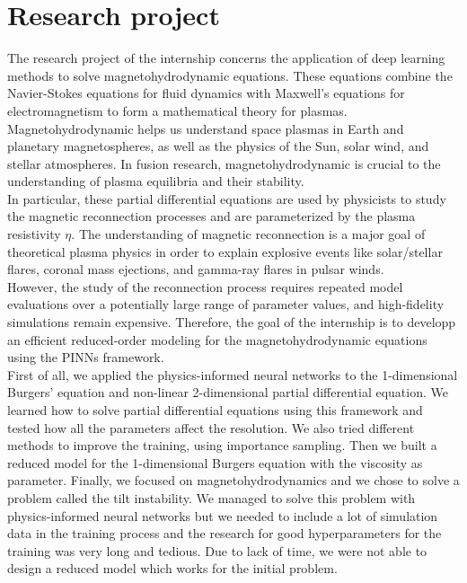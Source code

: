 \documentclass[12pt,openany]{amsbook}
\begin{document}
\section{Research project}

The research project of the internship concerns the application of deep learning methods to solve magnetohydrodynamic equations.
These equations combine the Navier-Stokes equations for fluid dynamics with Maxwell’s equations for electromagnetism 
to form a mathematical theory for plasmas.  Magnetohydrodynamic helps us understand space plasmas in Earth
and planetary magnetospheres, as well as the physics of the Sun, solar wind, and stellar atmospheres. 
In fusion research, magnetohydrodynamic is crucial to the understanding of plasma equilibria and their
stability.\\

In particular, these partial differential equations are used by physicists to study the magnetic reconnection processes and 
are parameterized by the plasma resistivity $\eta$. 
The understanding of magnetic reconnection is a major goal of theoretical plasma physics in order to explain explosive events 
like solar/stellar flares, coronal mass ejections, and gamma-ray
flares in pulsar winds. \cite{Baty_2019}\\

However, the study of the reconnection process requires repeated model evaluations 
over a potentially large range of parameter values, and high-fidelity simulations remain  expensive.
Therefore, the goal of the internship is to developp an efficient reduced-order modeling for the magnetohydrodynamic equations
using the PINNs framework.\\

First of all, we applied the physics-informed neural networks to the 1-dimensional Burgers' equation and non-linear 
2-dimensional partial differential equation. 
We learned how to solve partial differential equations using this framework  and tested how all the parameters
affect the resolution. We also tried different methods to improve the training, using importance sampling.
Then we built a reduced model for the 1-dimensional Burgers equation with the viscosity as parameter.
Finally, we focused on magnetohydrodynamics and we chose to solve a problem called the tilt instability. 
We managed to solve this problem with physics-informed neural networks but we needed to include a lot of
simulation data in the training process and the research for good hyperparameters for the training was very long
and tedious. Due to lack of time, we were not able to design a reduced model which works for the initial problem. 
\end{document}
